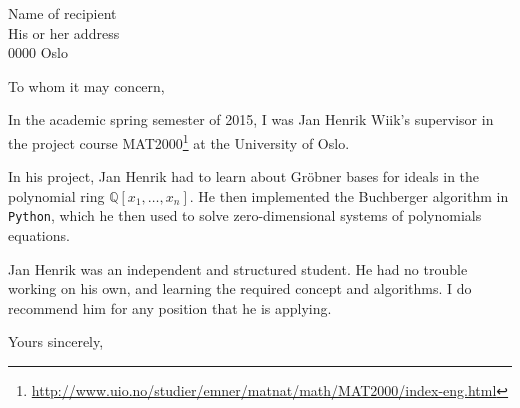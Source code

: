 \documentclass[UKenglish]{uioletter}
\begin{document}
\begin{letter}{Name of recipient\\ His or her address\\ 0000 Oslo}
\opening{To whom it may concern,}

In the academic spring semester of 2015, I was Jan Henrik Wiik's supervisor in the project course MAT2000\footnote{\url{http://www.uio.no/studier/emner/matnat/math/MAT2000/index-eng.html}} at the University of Oslo.

In his project, Jan Henrik had to learn about Gröbner bases for ideals in the polynomial ring $\mathbb Q[x_1,\ldots,x_n]$. He then implemented the Buchberger algorithm in \texttt{Python}, which he then used to solve zero-dimensional systems of polynomials equations.

Jan Henrik was an independent and structured student. He had no trouble working on his own, and learning the required concept and algorithms. I do recommend him for any position that he is applying.

\closing{Yours sincerely,}
\end{letter}
\end{document}
